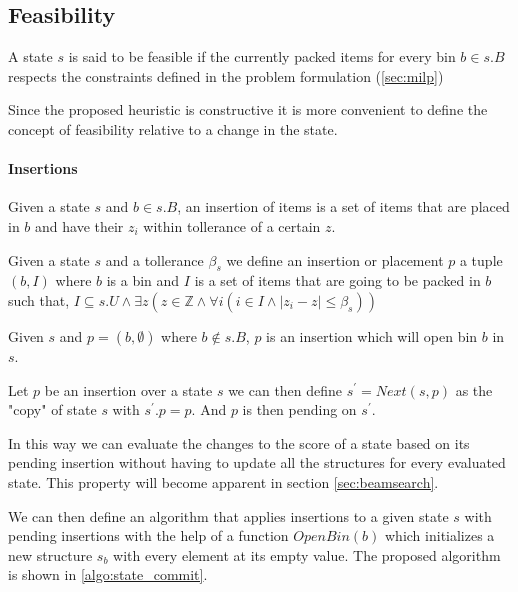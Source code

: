 \subsection{Feasibility}
\label{sec:problem_state:feasibility}%
A state $s$ is said to be feasible if the currently packed items for every bin $b \in s.B$ respects the constraints defined in the problem formulation (\ref{sec:milp})

Since the proposed heuristic is constructive it is more convenient to define the concept of feasibility relative to a change in the state.

\paragraph*{Insertions}

Given a state $s$ and $b \in s.B$, an insertion of items is a set of items that are placed in $b$ and have their $z_i$ within tollerance of a certain $z$.

\begin{definition}[Insertion]
    \label{def:insertion}%
    Given a state $s$ and a tollerance $\beta_s$ we define an insertion or placement $p$ a tuple $(b, I)$ where $b$ is a bin and $I$ is a set of items that are going to be packed in $b$ such that, $I \subseteq s.U \land \exists z (z \in \mathbb{Z} \land \forall i ( i \in I \land |z_i - z| \le \beta_s))$
\end{definition}

\begin{observation}
    \label{oss:state_bin_open}
    Given $s$ and $p = (b, \emptyset)$ where $b \notin s.B$, $p$ is an insertion which will open bin $b$ in $s$.
\end{observation}

\begin{definition}[Next]
    \label{def:state_next}%
    Let $p$ be an insertion over a state $s$ we can then define $s^\prime = Next(s, p)$ as the "copy" of state $s$ with $s^\prime.p = p$. And $p$ is then pending on $s^\prime$.
\end{definition}

In this way we can evaluate the changes to the score of a state based on its pending insertion without having to update all the structures for every evaluated state. This property will become apparent in section \ref{sec:beamsearch}. 

We can then define an algorithm that applies insertions to a given state $s$ with pending insertions with the help of a function $OpenBin(b)$ which initializes a new structure $s_b$ with every element at its empty value.
The proposed algorithm is shown in \ref{algo:state_commit}.

